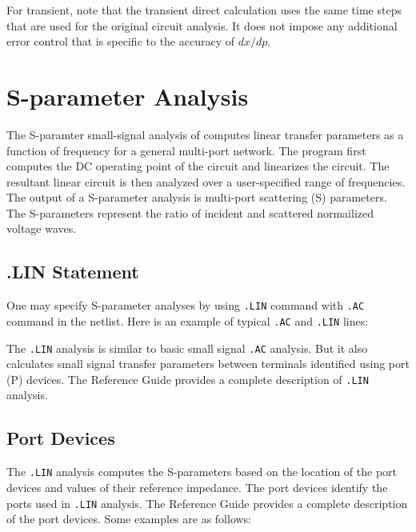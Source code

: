 For transient, note that the transient direct calculation uses the same time steps 
that are used for the original circuit analysis.  It does not impose any additional error
control that is specific to the accuracy of $dx/dp$.


\section{S-parameter Analysis}
\label{SP_Analysis}
\label{SP_Sweep_Overview}
  
 

The S-paramter small-signal analysis of \Xyce{} computes linear transfer parameters as a
function of frequency for a general multi-port network. The program first computes the DC operating point of 
the circuit and linearizes the circuit. The resultant linear circuit is then 
analyzed over a user-specified range of frequencies. The output of a S-parameter
analysis is multi-port scattering (S) parameters. The S-parameters represent
the ratio of incident and scattered normailized voltage waves.

\subsection{.LIN Statement}

One may specify S-parameter analyses by using \verb|.LIN| command with \verb|.AC| command in the netlist.  
Here is an example of typical \verb|.AC| and \verb|.LIN| lines:


The \verb|.LIN| analysis is similar to basic small signal \verb|.AC| analysis. But it also calculates small signal 
transfer parameters between terminals identified using port (P) devices. The \Xyce{} Reference Guide\ReferenceGuide{} 
provides a complete description of \verb|.LIN| analysis.

\subsection{Port Devices}
\label{SP_Port}

The \verb|.LIN| analysis computes the S-parameters based on the location of the port 
devices and values of their reference impedance. The port devices identify
the ports used in \verb|.LIN| analysis. The \Xyce{} Reference Guide\ReferenceGuide{} 
provides a complete description of the port devices. Some examples are as follows:

